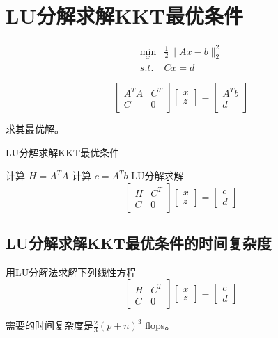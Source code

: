 \section{LU分解求解KKT最优条件}

\begin{problem}
    $$\begin{aligned}
        \min _{x} & \frac{1}{2}\|A x-b\|_{2}^{2}\\
        s.t. & C x=d
    \end{aligned}$$

    $$
\left[\begin{array}{cc}
A^{T} A & C^{T} \\
C & 0
\end{array}\right]\left[\begin{array}{l}
x \\
z
\end{array}\right]=\left[\begin{array}{c}
A^{T} b \\
d
\end{array}\right]
$$

求其最优解。
\end{problem}



\begin{algorithm}[htbp]
    \caption{LU分解求解KKT最优条件}
    计算 $ H=A^{T} A $\;
    计算 $ c=A^{T} b $ \;
    LU分解求解$$
    \left[\begin{array}{cc}
    H & C^{T} \\
    C & 0
    \end{array}\right]\left[\begin{array}{l}
    x \\
    z
    \end{array}\right]=\left[\begin{array}{l}
    c \\
    d
    \end{array}\right]
    $$\;
\end{algorithm}

\subsection{LU分解求解KKT最优条件的时间复杂度}

\begin{theorem}
    用LU分解法求解下列线性方程 
$$
\left[\begin{array}{cc}
H & C^{T} \\
C & 0
\end{array}\right]\left[\begin{array}{l}
x \\
z
\end{array}\right]=\left[\begin{array}{l}
c \\
d
\end{array}\right]
$$

需要的时间复杂度是$ \frac{2}{3}(p+n)^{3} $ flops。
\end{theorem}


